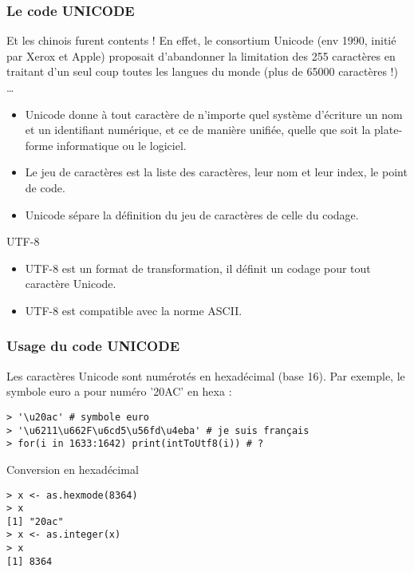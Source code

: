 \documentclass[10pt]{beamer}
\begin{document}
\begin{frame}
  \frametitle{Le code UNICODE}
Et les chinois furent contents ! En effet, le consortium \alert{Unicode} (env 1990, initié par Xerox et Apple) proposait d'abandonner la limitation des 255 caractères en traitant d'un seul coup toutes les
langues du monde (plus de 65000 caractères !) \dots
    \begin{itemize}
    \item \alert{Unicode} donne à tout caractère de n’importe quel système d'écriture un nom et un identifiant numérique, et ce de manière unifiée, quelle que soit la plate-forme informatique ou le logiciel.
    \item Le jeu de caractères est la liste des caractères, leur nom et leur index, le point de code.
    \item<alert@1> Unicode sépare la définition du jeu de caractères de celle du codage.   
    \end{itemize}

  \begin{block}{UTF-8}
    \begin{itemize}
    \item \alert{UTF-8 est un format de transformation}, il définit un codage pour tout caractère Unicode.
    \item<alert@1> UTF-8 est compatible avec la norme ASCII.
    \end{itemize}
  \end{block}

\end{frame}


\begin{frame}[fragile]
  \frametitle{Usage du code UNICODE}
  Les caractères Unicode sont numérotés en hexadécimal (base 16).
  Par exemple, le symbole euro a pour numéro '20AC' en hexa :
  \begin{lstlisting}
> '\u20ac' # symbole euro 
> '\u6211\u662F\u6cd5\u56fd\u4eba' # je suis français
> for(i in 1633:1642) print(intToUtf8(i)) # ?
\end{lstlisting}

\begin{exampleblock}{Conversion en hexadécimal}
\begin{lstlisting}[style=block]
> x <- as.hexmode(8364)
> x
[1] "20ac"
> x <- as.integer(x)
> x
[1] 8364  
\end{lstlisting}
\end{exampleblock}
\end{frame}
\end{document}
